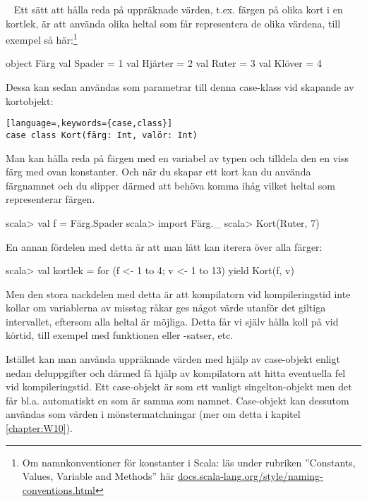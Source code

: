 \QUESTEND




\clearpage




\ExtraTasks %






\QUESTBEGIN

\Task  \what~  Ett sätt att hålla reda på uppräknade värden, t.ex. färgen på olika kort i en kortlek, är att använda olika heltal som får representera de olika värdena, till exempel så här:\footnote{Om namnkonventioner för konstanter i Scala: läs under rubriken ''Constants, Values, Variable and Methods'' här \href{http://docs.scala-lang.org/style/naming-conventions.html}{docs.scala-lang.org/style/naming-conventions.html}}
\begin{Code}
object Färg {
  val Spader = 1
  val Hjärter = 2
  val Ruter = 3
  val Klöver = 4
}
\end{Code}
Dessa kan sedan användas som parametrar till denna case-klass vid skapande av kortobjekt:
\begin{lstlisting}[language=,keywords={case,class}]
case class Kort(färg: Int, valör: Int)
\end{lstlisting}
Man kan hålla reda på färgen med en variabel av typen  och tilldela den en viss färg med ovan konstanter. Och när du skapar ett kort kan du använda färgnamnet och du slipper därmed att behöva komma ihåg vilket heltal som representerar färgen.
\begin{REPL}
scala> val f = Färg.Spader
scala> import Färg._
scala> Kort(Ruter, 7)
\end{REPL}
En annan fördelen med detta är att man lätt kan iterera över alla färger:
\begin{REPL}
scala> val kortlek = for (f <- 1 to 4; v <- 1 to 13) yield Kort(f, v)
\end{REPL}
Men den stora nackdelen med detta är att kompilatorn vid kompileringstid inte kollar om variablerna av misstag råkar ges något värde utanför det giltiga intervallet, eftersom alla heltal är möjliga. Detta får vi själv hålla koll på vid körtid, till exempel med funktionen  eller -satser, etc.

Istället kan man använda uppräknade värden med hjälp av case-objekt enligt nedan deluppgifter och därmed få hjälp av kompilatorn att hitta eventuella fel vid kompileringstid.  Ett case-objekt är som ett vanligt singelton-objekt men det får bl.a. automatiskt en  som är samma som namnet. Case-objekt kan dessutom användas som värden i mönstermatchningar (mer om detta i kapitel \ref{chapter:W10}).

